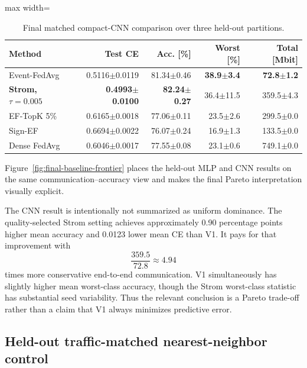 \begin{table}[ht]
\centering
\small
\caption{Final matched compact-CNN comparison over three held-out partitions.}
\label{tab:final-baseline-cnn}
\begin{adjustbox}{max width=\textwidth}
\begin{tabular}{lrrrr}
\toprule
Method & Test CE & Acc. [\%] & Worst [\%] & Total [Mbit]\\
\midrule
Event-FedAvg & 0.5116$\pm$0.0119 & 81.34$\pm$0.46 & \textbf{38.9$\pm$3.4} & \textbf{72.8$\pm$1.2}\\
\textbf{Strom, $\tau=0.005$} & \textbf{0.4993$\pm$0.0100} & \textbf{82.24$\pm$0.27} & 36.4$\pm$11.5 & 359.5$\pm$4.3\\
EF-TopK 5\% & 0.6165$\pm$0.0018 & 77.06$\pm$0.11 & 23.5$\pm$2.6 & 299.5$\pm$0.0\\
Sign-EF & 0.6694$\pm$0.0022 & 76.07$\pm$0.24 & 16.9$\pm$1.3 & 133.5$\pm$0.0\\
Dense FedAvg & 0.6046$\pm$0.0017 & 77.55$\pm$0.08 & 23.1$\pm$0.6 & 749.1$\pm$0.0\\
\bottomrule
\end{tabular}
\end{adjustbox}
\end{table}

Figure~\ref{fig:final-baseline-frontier} places the held-out MLP and CNN results on the same communication--accuracy view and makes the final Pareto interpretation visually explicit.

\FinalBaselineFigure

The CNN result is intentionally not summarized as uniform dominance. The quality-selected Strom setting achieves approximately 0.90 percentage points higher mean accuracy and 0.0123 lower mean CE than V1. It pays for that improvement with
\begin{equation}
    \frac{359.5}{72.8}\approx4.94
\end{equation}
times more conservative end-to-end communication. V1 simultaneously has slightly higher mean worst-class accuracy, though the Strom worst-class statistic has substantial seed variability. Thus the relevant conclusion is a Pareto trade-off rather than a claim that V1 always minimizes predictive error.

\subsection{Held-out traffic-matched nearest-neighbor control}

